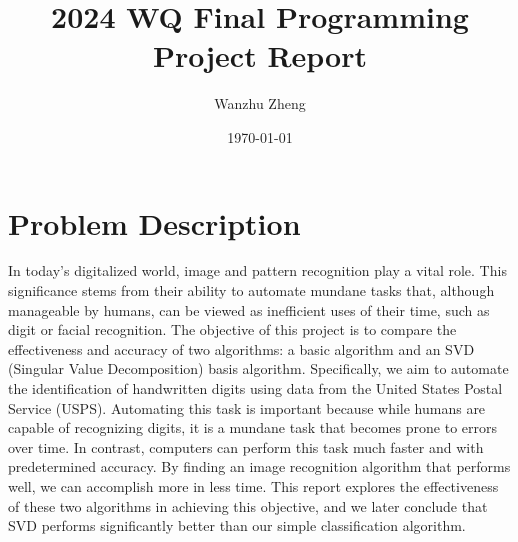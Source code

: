 \documentclass{article} %
\title{2024 WQ Final Programming Project Report}
\author{Wanzhu Zheng} %
\date{\today}
\begin{document}
\maketitle
\tableofcontents
\newpage

  \section{Problem Description}
    \label{SECT:SECTION 1}
    In today's digitalized world, image and pattern recognition play a vital role. This significance stems from their ability to automate mundane tasks that, although manageable by humans, can be viewed as inefficient uses of their time, such as digit or facial recognition. The objective of this project is to compare the effectiveness and accuracy of two algorithms: a basic algorithm and an SVD (Singular Value Decomposition) basis algorithm. Specifically, we aim to automate the identification of handwritten digits using data from the United States Postal Service (USPS). Automating this task is important because while humans are capable of recognizing digits, it is a mundane task that becomes prone to errors over time. In contrast, computers can perform this task much faster and with predetermined accuracy. By finding an image recognition algorithm that performs well, we can accomplish more in less time. This report explores the effectiveness of these two algorithms in achieving this objective, and we later conclude that SVD performs significantly better than our simple classification algorithm.
\end{document}
